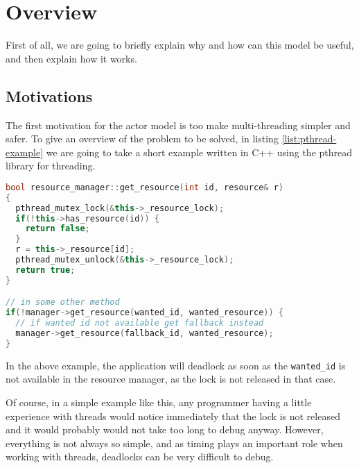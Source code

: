 \section{Overview}
%
First of all, we are going to briefly explain why and how can this model be useful, 
and then explain how it works.
%
\subsection{Motivations}
%
The first motivation for the actor model is too make multi-threading simpler and safer.
To give an overview of the problem to be solved, in listing \ref{list:pthread-example}
we are going to take a short example written in C++ using the pthread 
library for threading.
%
\begin{lstlisting}[basicstyle=\footnotesize,caption=Threading example in C++,language=C++,label=list:pthread-example]
bool resource_manager::get_resource(int id, resource& r)
{
  pthread_mutex_lock(&this->_resource_lock);
  if(!this->has_resource(id)) {
    return false;
  }
  r = this->_resource[id];
  pthread_mutex_unlock(&this->_resource_lock);
  return true;
}

// in some other method
if(!manager->get_resource(wanted_id, wanted_resource)) {
  // if wanted id not available get fallback instead
  manager->get_resource(fallback_id, wanted_resource);
}
\end{lstlisting}
In the above example, the application will deadlock as soon as the \lstinline{wanted_id}
is not available in the resource manager, as the lock is not released in that case.

Of course, in a simple example like this, any programmer having a little experience 
with threads would notice immediately that the lock is not released and it would 
probably would not take too long to debug anyway. However, everything is not always 
so simple, and as timing plays an important role when working with threads, 
deadlocks can be very difficult to debug.